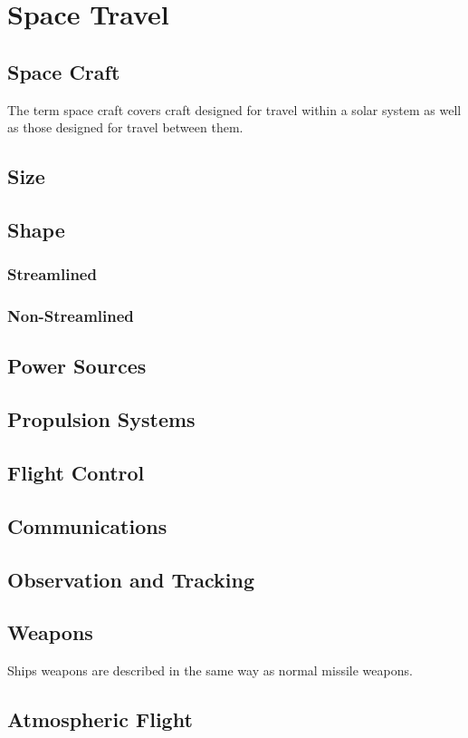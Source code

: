 \chapter{Space Travel}

\section{Space Craft}

The term space craft covers craft designed for travel within a solar 
system as well as those designed for travel between them.

\section{Size}
\section{Shape}
\subsection{Streamlined}
\subsection{Non-Streamlined}
\section{Power Sources}
\section{Propulsion Systems}
\section{Flight Control}
\section{Communications}
\section{Observation and Tracking}
\section{Weapons}
Ships weapons are de\-scribed in the same way as nor\-mal mis\-sile weapons.

\section{Atmospheric Flight}
